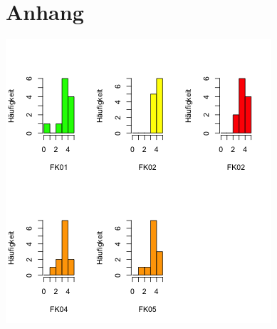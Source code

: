\documentclass[12pt, bibliography=totoc]{scrartcl}
\begin{document}
  \section{Anhang}
  \includegraphics{Anhang/schoen.png}
  


%
%
\end{document}
